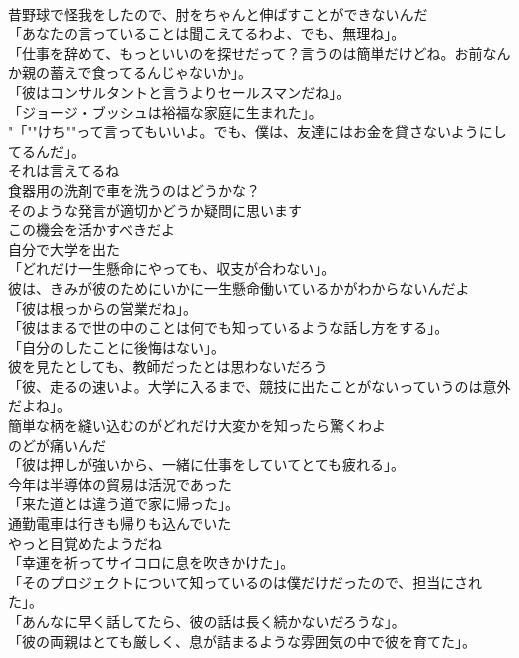 \documentclass[8pt]{extreport}
\begin{document}
\begin{CJK}{UTF8}{min}
\\	昔野球で怪我をしたので、肘をちゃんと伸ばすことができないんだ	
\\	「あなたの言っていることは聞こえてるわよ、でも、無理ね」。	
\\	「仕事を辞めて、もっといいのを探せだって？言うのは簡単だけどね。お前なんか親の蓄えで食ってるんじゃないか」。	
\\	「彼はコンサルタントと言うよりセールスマンだね」。	
\\	「ジョージ・ブッシュは裕福な家庭に生まれた」。	
\\	"「""けち""って言ってもいいよ。でも、僕は、友達にはお金を貸さないようにしてるんだ」。
\\	それは言えてるね	
\\	食器用の洗剤で車を洗うのはどうかな？	
\\	そのような発言が適切かどうか疑問に思います	
\\	この機会を活かすべきだよ	
\\	自分で大学を出た	
\\	「どれだけ一生懸命にやっても、収支が合わない」。	
\\	彼は、きみが彼のためにいかに一生懸命働いているかがわからないんだよ	
\\	「彼は根っからの営業だね」。	
\\	「彼はまるで世の中のことは何でも知っているような話し方をする」。	
\\	「自分のしたことに後悔はない」。	
\\	彼を見たとしても、教師だったとは思わないだろう	
\\	「彼、走るの速いよ。大学に入るまで、競技に出たことがないっていうのは意外だよね」。	
\\	簡単な柄を縫い込むのがどれだけ大変かを知ったら驚くわよ	
\\	のどが痛いんだ	
\\	「彼は押しが強いから、一緒に仕事をしていてとても疲れる」。	
\\	今年は半導体の貿易は活況であった	
\\	「来た道とは違う道で家に帰った」。	
\\	通勤電車は行きも帰りも込んでいた	
\\	やっと目覚めたようだね 
\\	「幸運を祈ってサイコロに息を吹きかけた」。	
\\	「そのプロジェクトについて知っているのは僕だけだったので、担当にされた」。	
\\	「あんなに早く話してたら、彼の話は長く続かないだろうな」。	
\\	「彼の両親はとても厳しく、息が詰まるような雰囲気の中で彼を育てた」。	

\end{CJK}
\end{document}
